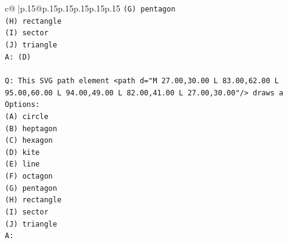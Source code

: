 \documentclass{article}
\begin{document}
{\begin{supertabular}{c@{$\;$}|p{.15\linewidth}@{}p{.15\linewidth}p{.15\linewidth}p{.15\linewidth}p{.15\linewidth}p{.15\linewidth}}
{{{\texttt{(G) pentagon} \\
\texttt{(H) rectangle} \\
\texttt{(I) sector} \\
\texttt{(J) triangle} \\
\texttt{A: (D)} \\
\\ 
\texttt{Q: This SVG path element <path d="M 27.00,30.00 L 83.00,62.00 L 95.00,60.00 L 94.00,49.00 L 82.00,41.00 L 27.00,30.00"/> draws a} \\
\texttt{Options:} \\
\texttt{(A) circle} \\
\texttt{(B) heptagon} \\
\texttt{(C) hexagon} \\
\texttt{(D) kite} \\
\texttt{(E) line} \\
\texttt{(F) octagon} \\
\texttt{(G) pentagon} \\
\texttt{(H) rectangle} \\
\texttt{(I) sector} \\
\texttt{(J) triangle} \\
\texttt{A:} \\
            }
        }
    }
     \\ \\


\end{supertabular}}
\end{document}
